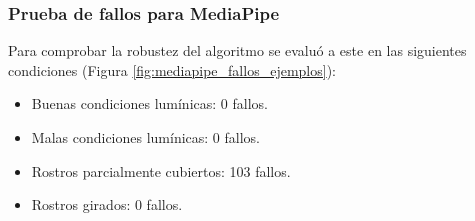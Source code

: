 \subsubsection{Prueba de fallos para MediaPipe}

Para comprobar la robustez del algoritmo se evaluó a este en las siguientes condiciones (Figura \ref{fig:mediapipe_fallos_ejemplos}):

\begin{itemize}
    \item Buenas condiciones lumínicas: 0 fallos.
    \item Malas condiciones lumínicas: 0 fallos.
    \item Rostros parcialmente cubiertos: 103 fallos.
    \item Rostros girados: 0 fallos.
\end{itemize}

